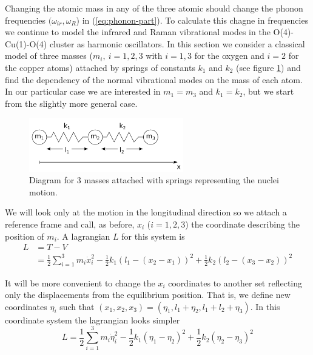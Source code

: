 Changing the atomic mass in any of the three atomic should change the phonon frequencies $(\omega_{ir},\omega_R$) in (\ref{eq:phonon-part}).
To calculate this chagne in frequencies we continue to model the infrared and Raman vibrational modes in the O(4)-Cu(1)-O(4) cluster as harmonic oscillators.
In this section we consider a classical model of three masses ($m_i,\ i=1,2,3$ with $i=1,3$ for the oxygen and $i=2$ for the copper atoms) attached by springs of constants $k_1$ and $k_2$ (see figure \ref{fig:3-masses-2-springs}) and find the dependency of the normal vibrational modes on the mass of each atom.
In our particular case we are interested in $m_1=m_3$ and $k_1=k_2$, but we start from the slightly more general case.

\begin{figure}[ht]
  \centering
  \includegraphics[width=0.6\textwidth]{images/3-masses-2-springs-linear.png}
  \caption{Diagram for 3 masses attached with springs representing the nuclei motion.}
  \label{fig:3-masses-2-springs}
\end{figure}
%
We will look only at the motion in the longitudinal direction so we attach a reference frame and call, as before, $x_i$ ($i=1,2,3$) the coordinate describing the position of $m_i$.
A lagrangian $L$ for this system is 
%
\begin{align}
L & = T-V\\ 
  & = \frac{1}{2}\sum_{i=1}^3 m_i \dot{x}_i^2 - \frac{1}{2}k_1(l_1-(x_2-x_1))^2+\frac{1}{2}k_2(l_2-(x_3-x_2))^2
\end{align}

It will be more convenient to change the $x_i$ coordinates to another set reflecting only the displacements from the equilibrium position.
That is, we define new coordinates $\eta_i$ such that $(x_1,x_2,x_3)=(\eta_1,l_1+\eta_2,l_1+l_2+\eta_3)$. 
In this coordinate system the lagrangian looks simpler
%
\begin{equation}
  L= \frac{1}{2}\sum_{i=1}^3 m_i \dot{\eta}_i^2-\frac{1}{2}k_1(\eta_1-\eta_2)^2+\frac{1}{2}k_2(\eta_2-\eta_3)^2
\end{equation}

